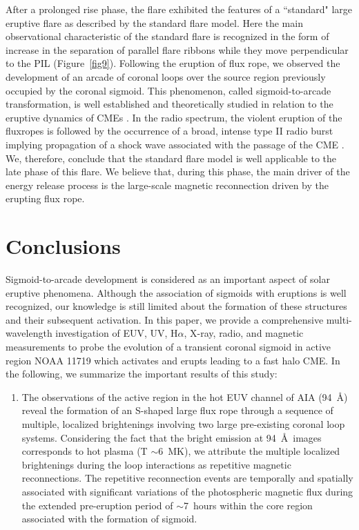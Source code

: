 \documentclass[twocolumn]{aastex6}
\begin{document}
{After a prolonged rise phase, the flare exhibited the features of a ``standard" large eruptive flare as described by the standard flare model. Here the main observational characteristic of the standard flare is recognized in the form of increase in the separation of parallel flare ribbons while they move perpendicular to the PIL (Figure~\ref{fig9}). Following the eruption of flux rope, we observed the development of an arcade of coronal loops over the source region previously occupied by the coronal sigmoid. This phenomenon, called sigmoid-to-arcade transformation, is well established and theoretically studied in relation to the eruptive dynamics of CMEs \citep{Gibson2002, Gibson2004}. 
In the radio spectrum, the violent eruption of the fluxropes is followed by the occurrence of a broad, intense type II radio burst implying propagation of a shock wave associated with the passage of the CME \citep[see e.g.,][]{Cho2005}. We, therefore, conclude that the standard flare model is well applicable to the late phase of this flare. We believe that, during this phase, the main driver of the energy release process is the large-scale magnetic reconnection driven by the erupting flux rope. 

\section{Conclusions} 
\label{sec_conclusion}

Sigmoid-to-arcade development is considered as an important aspect of solar eruptive phenomena. Although the association of sigmoids with eruptions is well recognized, our knowledge is still limited about the formation of these structures and their subsequent activation. In this paper, we provide a comprehensive multi-wavelength investigation of EUV, UV, H$\alpha$, X-ray, radio, and magnetic measurements to probe the evolution of a transient coronal sigmoid in active region NOAA 11719 which activates and erupts leading to a fast halo CME. In the following, we summarize the important results of this study:

\begin{enumerate}
\item
The observations of the active region in the hot EUV channel of AIA (94~\AA) reveal the formation of an S-shaped large flux rope through a sequence of multiple, localized brightenings involving two large pre-existing coronal loop systems. Considering the fact that the bright emission at 94~\AA~images corresponds to hot plasma (T $\sim$6~MK), we attribute the multiple localized brightenings during the loop interactions as repetitive magnetic reconnections. The repetitive reconnection events are temporally and spatially associated with significant variations of the photospheric magnetic flux during the extended pre-eruption period of $\sim$7~hours within the core region associated with the formation of sigmoid. 


\end{enumerate}}
\end{document}
